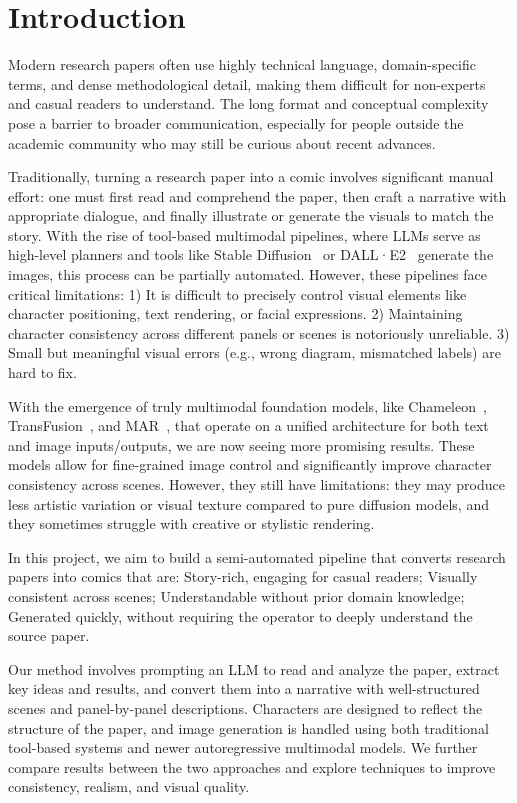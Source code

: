 \section{Introduction}\label{sec:introduction}


Modern research papers often use highly technical language, domain-specific terms,
and dense methodological detail, making them difficult for non-experts and casual readers to understand.
The long format and conceptual complexity pose a barrier to broader communication,
especially for people outside the academic community who may still be curious about recent advances.

Traditionally, turning a research paper into a comic involves significant manual effort:
one must first read and comprehend the paper, then craft a narrative with appropriate dialogue,
and finally illustrate or generate the visuals to match the story.
With the rise of tool-based multimodal pipelines, where LLMs serve as high-level planners and tools like
Stable Diffusion~\cite{rombach2022high} or DALL·E2~\cite{ramesh2021zero} generate the images,
this process can be partially automated.
However, these pipelines face critical limitations:
1) It is difficult to precisely control visual elements like character positioning, text rendering, or facial expressions.
2) Maintaining character consistency across different panels or scenes is notoriously unreliable.
3) Small but meaningful visual errors (e.g., wrong diagram, mismatched labels) are hard to fix.

With the emergence of truly multimodal foundation models,
like Chameleon~\cite{team2024chameleon}, TransFusion~\cite{zhou2024transfusion}, and MAR~\cite{li2024autoregressive},
that operate on a unified architecture for both text and image inputs/outputs, we are now seeing more promising results.
These models allow for fine-grained image control and significantly improve character consistency across scenes.
However, they still have limitations: they may produce less artistic variation or visual texture
compared to pure diffusion models, and they sometimes struggle with creative or stylistic rendering.

In this project, we aim to build a semi-automated pipeline that converts research papers into comics that are:
Story-rich, engaging for casual readers;
Visually consistent across scenes;
Understandable without prior domain knowledge;
Generated quickly, without requiring the operator to deeply understand the source paper.

Our method involves prompting an LLM to read and analyze the paper, extract key ideas and results,
and convert them into a narrative with well-structured scenes and panel-by-panel descriptions.
Characters are designed to reflect the structure of the paper,
and image generation is handled using both traditional tool-based systems and newer autoregressive multimodal models.
We further compare results between the two approaches and explore techniques to improve consistency, realism, and visual quality.



